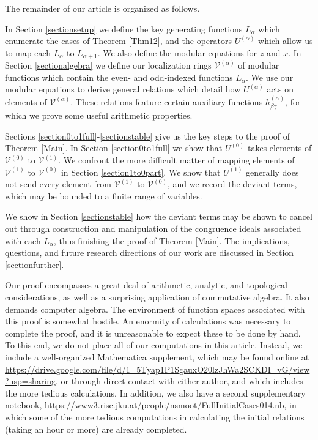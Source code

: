 \documentclass[reqno]{amsart}
\theoremstyle{definition}
\theoremstyle{remark}
\numberwithin{equation}{section}
\begin{document}
The remainder of our article is organized as follows.  %

In Section \ref{sectionsetup} we define the key generating functions $L_{\alpha}$ which enumerate the cases of Theorem \ref{Thm12}, and the operators $U^{(\alpha)}$ which allow us to map each $L_{\alpha}$ to $L_{\alpha+1}$.  We also define the modular equations for $z$ and $x$.  In Section \ref{sectionalgebra} we define our localization rings $\mathcal{V}^{(\alpha)}$ of modular functions which contain the even- and odd-indexed functions $L_{\alpha}$.  We use our modular equations to derive general relations which detail how $U^{(\alpha)}$ acts on elements of $\mathcal{V}^{(\alpha)}$.  These relations feature certain auxiliary functions $h^{(\alpha)}_{\beta\gamma}$, for which we prove some useful arithmetic properties.

Sections \ref{section0to1full}-\ref{sectionstable} give us the key steps to the proof of Theorem \ref{Main}.  In Section \ref{section0to1full} we show that $U^{(0)}$ takes elements of $\mathcal{V}^{(0)}$ to $\mathcal{V}^{(1)}$.  We confront the more difficult matter of mapping elements of $\mathcal{V}^{(1)}$ to $\mathcal{V}^{(0)}$ in Section \ref{section1to0part}.  We show that $U^{(1)}$ generally does not send every element from $\mathcal{V}^{(1)}$ to $\mathcal{V}^{(0)}$, and we record the deviant terms, which may be bounded to a finite range of variables.

We show in Section \ref{sectionstable} how the deviant terms may be shown to cancel out through construction and manipulation of the congruence ideals associated with each $L_{\alpha}$, thus finishing the proof of Theorem \ref{Main}.  The implications, questions, and future research directions of our work are discussed in Section \ref{sectionfurther}.

Our proof encompasses a great deal of arithmetic, analytic, and topological considerations, as well as a surprising application of commutative algebra.  It also demands computer algebra.  The environment of function spaces associated with this proof is somewhat hostile.  An enormity of calculations was necessary to complete the proof, and it is unreasonable to expect these to be done by hand.  To this end, we do not place all of our computations in this article.  Instead, we include a well-organized Mathematica supplement, which may be found online at \url{https://drive.google.com/file/d/1_5Tyap1P1SgauxO20lzJhWa2SCKDI_vG/view?usp=sharing}, or through direct contact with either author, and which includes the more tedious calculations.  In addition, we also have a second supplementary notebook, \url{https://www3.risc.jku.at/people/nsmoot/FullInitialCases014.nb}, in which some of the more tedious computations in calculating the initial relations (taking an hour or more) are already completed.
\end{document}
